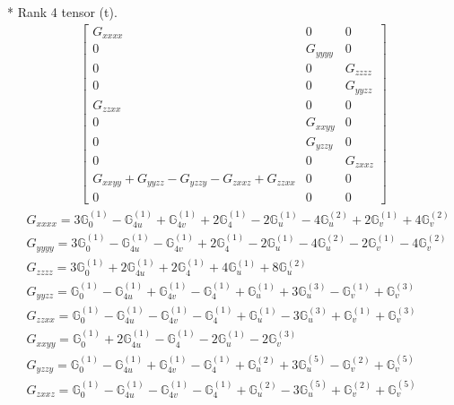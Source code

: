 \documentclass[fleqn,8pt,landscape]{jsarticle}
\begin{document}
* Rank 4 tensor (t).
\begin{align*}
\begin{bmatrix} G_{xxxx} & 0 & 0 \\ 0 & G_{yyyy} & 0 \\ 0 & 0 & G_{zzzz} \\ 0 & 0 & G_{yyzz} \\ G_{zzxx} & 0 & 0 \\ 0 & G_{xxyy} & 0 \\ 0 & G_{yzzy} & 0 \\ 0 & 0 & G_{zxxz} \\ G_{xxyy} + G_{yyzz} - G_{yzzy} - G_{zxxz} + G_{zzxx} & 0 & 0 \\ 0 & 0 & 0 \end{bmatrix}
\end{align*}
\begin{align*}
& G_{xxxx} = 3 \mathbb{G}_{0}^{(1)} - \mathbb{G}_{4u}^{(1)} + \mathbb{G}_{4v}^{(1)} + 2 \mathbb{G}_{4}^{(1)} - 2 \mathbb{G}_{u}^{(1)} - 4 \mathbb{G}_{u}^{(2)} + 2 \mathbb{G}_{v}^{(1)} + 4 \mathbb{G}_{v}^{(2)} \\
& G_{yyyy} = 3 \mathbb{G}_{0}^{(1)} - \mathbb{G}_{4u}^{(1)} - \mathbb{G}_{4v}^{(1)} + 2 \mathbb{G}_{4}^{(1)} - 2 \mathbb{G}_{u}^{(1)} - 4 \mathbb{G}_{u}^{(2)} - 2 \mathbb{G}_{v}^{(1)} - 4 \mathbb{G}_{v}^{(2)} \\
& G_{zzzz} = 3 \mathbb{G}_{0}^{(1)} + 2 \mathbb{G}_{4u}^{(1)} + 2 \mathbb{G}_{4}^{(1)} + 4 \mathbb{G}_{u}^{(1)} + 8 \mathbb{G}_{u}^{(2)} \\
& G_{yyzz} = \mathbb{G}_{0}^{(1)} - \mathbb{G}_{4u}^{(1)} + \mathbb{G}_{4v}^{(1)} - \mathbb{G}_{4}^{(1)} + \mathbb{G}_{u}^{(1)} + 3 \mathbb{G}_{u}^{(3)} - \mathbb{G}_{v}^{(1)} + \mathbb{G}_{v}^{(3)} \\
& G_{zzxx} = \mathbb{G}_{0}^{(1)} - \mathbb{G}_{4u}^{(1)} - \mathbb{G}_{4v}^{(1)} - \mathbb{G}_{4}^{(1)} + \mathbb{G}_{u}^{(1)} - 3 \mathbb{G}_{u}^{(3)} + \mathbb{G}_{v}^{(1)} + \mathbb{G}_{v}^{(3)} \\
& G_{xxyy} = \mathbb{G}_{0}^{(1)} + 2 \mathbb{G}_{4u}^{(1)} - \mathbb{G}_{4}^{(1)} - 2 \mathbb{G}_{u}^{(1)} - 2 \mathbb{G}_{v}^{(3)} \\
& G_{yzzy} = \mathbb{G}_{0}^{(1)} - \mathbb{G}_{4u}^{(1)} + \mathbb{G}_{4v}^{(1)} - \mathbb{G}_{4}^{(1)} + \mathbb{G}_{u}^{(2)} + 3 \mathbb{G}_{u}^{(5)} - \mathbb{G}_{v}^{(2)} + \mathbb{G}_{v}^{(5)} \\
& G_{zxxz} = \mathbb{G}_{0}^{(1)} - \mathbb{G}_{4u}^{(1)} - \mathbb{G}_{4v}^{(1)} - \mathbb{G}_{4}^{(1)} + \mathbb{G}_{u}^{(2)} - 3 \mathbb{G}_{u}^{(5)} + \mathbb{G}_{v}^{(2)} + \mathbb{G}_{v}^{(5)}
\end{align*}
\end{document}
